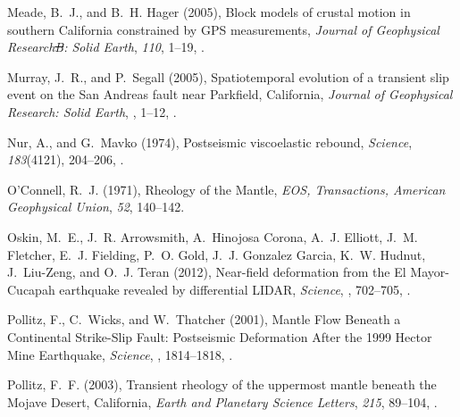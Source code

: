 \documentclass[draft,linenumbers]{AGUJournal}
\providecommand{\DIFadd}[1]{{\protect\color{blue}\uwave{#1}}} %
\providecommand{\DIFdel}[1]{{\protect\color{red}\sout{#1}}}                      %
\providecommand{\DIFaddbegin}{} %
\providecommand{\DIFaddend}{} %
\providecommand{\DIFdelbegin}{} %
\providecommand{\DIFdelend}{} %
\begin{document}
\begin{thebibliography}{52}
Meade, B.~J., and B.~H. Hager (2005), {Block models of crustal motion in southern California constrained by GPS measurements}, \textit{Journal of Geophysical Research\DIFdelbegin \DIFdel{B}\DIFdelend : Solid Earth}, \textit{110}\DIFaddbegin \DIFadd{(B03403)}\DIFaddend , 1--19, .

Murray, J.~R., and P.~Segall (2005), {Spatiotemporal evolution of a transient slip event on the San Andreas fault near Parkfield, California}, \textit{Journal of Geophysical Research: Solid Earth}, \DIFdelbegin %
\DIFdelend \DIFaddbegin \textit{\DIFadd{110}}\DIFadd{(B09407)}\DIFaddend , 1--12, .

Nur, A., and G.~Mavko (1974), {Postseismic viscoelastic rebound}, \textit{Science}, \textit{183}(4121), 204--206, .

O'Connell, R.~J. (1971), {Rheology of the Mantle}, \textit{EOS, Transactions, American Geophysical Union}, \textit{52}, 140--142.

Oskin, M.~E., J.~R. Arrowsmith, A.~{Hinojosa Corona}, A.~J. Elliott, J.~M. Fletcher, E.~J. Fielding, P.~O. Gold, J.~J. {Gonzalez Garcia}, K.~W. Hudnut, J.~Liu-Zeng, and O.~J. Teran (2012), {Near-field deformation from the El Mayor-Cucapah earthquake revealed by differential LIDAR}, \textit{Science}, \DIFdelbegin %
\DIFdelend \DIFaddbegin \textit{\DIFadd{335}}\DIFaddend , 702--705, .

Pollitz, F., C.~Wicks, and W.~Thatcher (2001), {Mantle Flow Beneath a Continental Strike-Slip Fault: Postseismic Deformation After the 1999 Hector Mine Earthquake}, \textit{Science}, \DIFdelbegin %
\DIFdelend \DIFaddbegin \textit{\DIFadd{293}}\DIFaddend , 1814--1818, .

Pollitz, F.~F. (2003), {Transient rheology of the uppermost mantle beneath the Mojave Desert, California}, \textit{Earth and Planetary Science Letters}, \textit{215}, 89--104, .


\end{thebibliography}
\end{document}
